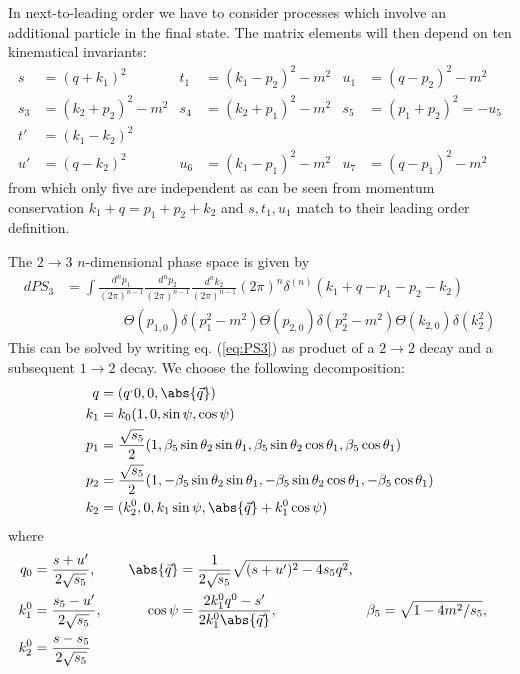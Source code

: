 \label{sec:NLO.PS}
In next-to-leading order we have to consider processes which involve an additional particle in the final state. The matrix elements will then depend on ten kinematical invariants:
\begin{align}
s &= (q+k_1)^2 &t_1 &=(k_1-p_2)^2-m^2 &u_1 &=(q-p_2)^2 -m^2\\
s_3 &= (k_2+p_2)^2-m^2 &s_4 &=(k_2+p_1)^2-m^2 &s_5 &= (p_1+p_2)^2=-u_5\\
t' &= (k_1-k_2)^2\\
u' &= (q-k_2)^2 &u_6 &=(k_1-p_1)^2-m^2 &u_7 &=(q-p_1)^2-m^2
\end{align}
from which only five are independent as can be seen from momentum conservation $k_1+q=p_1+p_2+k_2$ and $s,t_1,u_1$ match to their leading order definition.

The $2\rightarrow 3$ $n$-dimensional phase space is given by
\begin{align}
dPS_3 &= \!\int\!\!\frac{d^{n}p_1}{(2\pi)^{n-1}}\frac{d^{n}p_2}{(2\pi)^{n-1}}\frac{d^{n}k_2}{(2\pi)^{n-1}}(2\pi)^n\delta^{(n)}(k_1+q-p_1-p_2-k_2) \nonumber\\
 &\hspace{50pt}\Theta(p_{1,0})\delta(p_1^2-m^2)\Theta(p_{2,0})\delta(p_2^2-m^2)\Theta(k_{2,0})\delta(k_2^2) \label{eq:PS3}
\end{align}
This can be solved by writing eq. (\ref{eq:PS3}) as product of a $2\rightarrow 2$ decay and a subsequent $1\rightarrow 2$ decay\cite{PhysRevD4054}. We choose the following decomposition\cite{Harris:1995tu}:
\begin{align}
q &= (q^,0,0,\abs{\vec q})\\
k_1 &= k_0(1,0,\sin\psi,\cos\psi)\\
p_1 &= \frac {\sqrt{s_5}}{2}(1,\beta_5\sin\theta_2\sin\theta_1,\beta_5\sin\theta_2\cos\theta_1,\beta_5\cos\theta_1)\\
p_2 &= \frac {\sqrt{s_5}}{2}(1,-\beta_5\sin\theta_2\sin\theta_1,-\beta_5\sin\theta_2\cos\theta_1,-\beta_5\cos\theta_1)\\
k_2 &= (k_2^0,0,k_1\sin\psi,\abs{\vec q}+k_1^0\cos\psi)
\end{align}
where
\begin{align}
q_0 &= \frac {s+u'}{2\sqrt{s_5}},\quad
&\abs{\vec q} &= \frac {1}{2\sqrt{s_5}}\sqrt{(s+u')^2-4s_5q^2},\\
k_1^0 &= \frac{s_5-u'}{2\sqrt{s_5}},\quad
&\cos\psi &= \frac{2k_1^0q^0-s'}{2k_1^0\abs{\vec q}},\quad
&\beta_5 &= \sqrt{1-4m^2/s_5},\\
k_2^0 &= \frac{s-s_5}{2\sqrt{s_5}}
\end{align}
